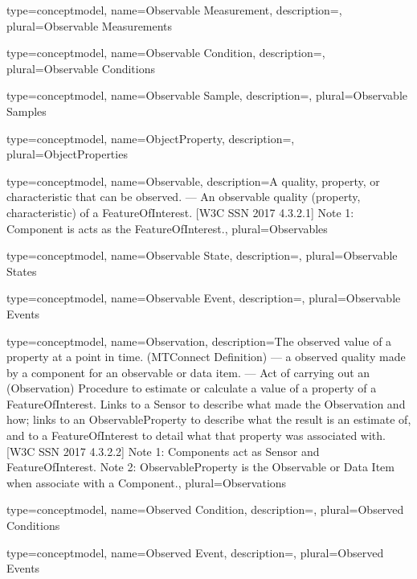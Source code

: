 {
	type={conceptmodel},
    name={Observable Measurement},
	description={},
	plural={Observable Measurements}
}

{
	type={conceptmodel},
    name={Observable Condition},
	description={},
	plural={Observable Conditions}
}

{
	type={conceptmodel},
    name={Observable Sample},
	description={},
	plural={Observable Samples}
}

{
	type={conceptmodel},
    name={ObjectProperty},
	description={},
	plural={ObjectProperties}
}

{
	type={conceptmodel},
    name={Observable},
	description={A quality, property, or characteristic that can be observed.
---
An observable quality (property, characteristic) of a FeatureOfInterest.
[W3C SSN 2017 4.3.2.1]
Note 1: Component is acts as the FeatureOfInterest.},
	plural={Observables}
}

{
	type={conceptmodel},
    name={Observable State},
	description={},
	plural={Observable States}
}

{
	type={conceptmodel},
    name={Observable Event},
	description={},
	plural={Observable Events}
}

{
	type={conceptmodel},
    name={Observation},
	description={The observed value of a property at a point in time. (MTConnect Definition)
---
a observed quality made by a component for an observable or data item.
---
Act of carrying out an (Observation) Procedure to estimate or calculate a value of a property of a FeatureOfInterest. Links to a Sensor to describe what made the Observation and how; links to an ObservableProperty to describe what the result is an estimate of, and to a FeatureOfInterest to detail what that property was associated with.
[W3C SSN 2017 4.3.2.2]
Note 1: Components act as Sensor and FeatureOfInterest.
Note 2: ObservableProperty is the Observable or Data Item when associate with a Component.},
	plural={Observations}
}

{
	type={conceptmodel},
    name={Observed Condition},
	description={},
	plural={Observed Conditions}
}

{
	type={conceptmodel},
    name={Observed Event},
	description={},
	plural={Observed Events}
}

